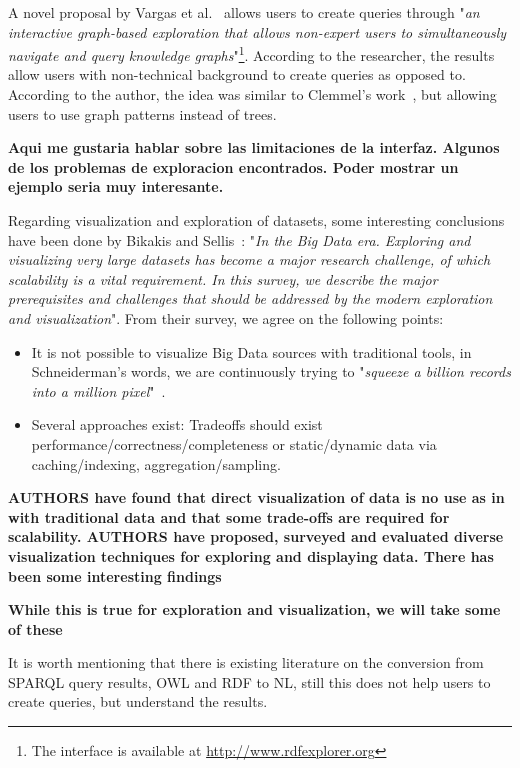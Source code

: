 A novel proposal by Vargas et al.~\cite{Vargas2019} allows users to create queries through "\textit{an interactive graph-based exploration that allows non-expert users to simultaneously navigate and query knowledge graphs}"\footnote{The interface is available at \url{http://www.rdfexplorer.org}}. According to the researcher, the results allow users with non-technical background to create queries as opposed to. 
According to the author, the idea was similar to Clemmel's work~\cite{Clemmer2011}, but allowing users to use graph patterns instead of trees.

\textbf{Aqui me gustaria hablar sobre las limitaciones de la interfaz. Algunos de los problemas de exploracion encontrados. Poder mostrar un ejemplo seria muy interesante.}

Regarding visualization and exploration of datasets, some interesting conclusions have been done by Bikakis and Sellis~\cite{Bikakis2016}: "\textit{In the Big Data era. Exploring and visualizing very large datasets has become a major research challenge, of which scalability is a vital requirement. In this survey, we describe the major prerequisites and challenges that should be addressed by the modern exploration and visualization}". From their survey, we agree on the following points:
\begin{itemize}
    \item It is not possible to visualize Big Data sources with traditional tools, in Schneiderman's words, we are continuously trying to "\textit{squeeze a billion records into a million pixel}"~\cite{Shneiderman2008}.
    \item Several approaches exist: Tradeoffs should exist performance/correctness/completeness or static/dynamic data via caching/indexing, aggregation/sampling.
\end{itemize}

\textbf{AUTHORS have found that direct visualization of data is no use as in with traditional data and that some trade-offs are required for scalability. AUTHORS have proposed, surveyed and evaluated diverse visualization techniques for exploring and displaying data. There has been some interesting findings}

\textbf{While this is true for exploration and visualization, we will take some of these }

It is worth mentioning that there is existing literature \cite{Lehmann2012, Ngomo2013, Cimiano2013, Lehmann2013, Androutsopoulos2014, Colin2016, Ngomo2019} on the conversion from SPARQL query results, OWL and RDF to NL, still this does not help users to create queries, but understand the results.

